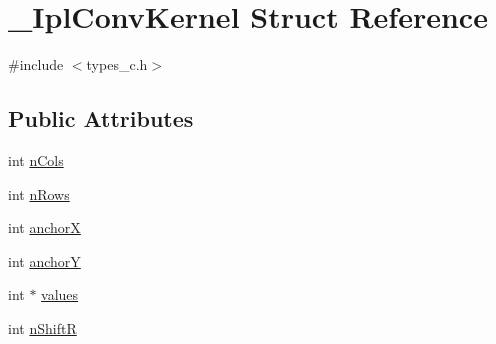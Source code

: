 \hypertarget{struct__IplConvKernel}{\section{\-\_\-\-Ipl\-Conv\-Kernel Struct Reference}
\label{struct__IplConvKernel}
}


{\ttfamily \#include $<$types\-\_\-c.\-h$>$}

\subsection*{Public Attributes}
\begin{DoxyCompactItemize}
\item 
int \hyperlink{struct__IplConvKernel_a222bb4c7231dcbec0ac75d9f6a38b4f4}{n\-Cols}
\item 
int \hyperlink{struct__IplConvKernel_a75a9788f86172938e3e1cfc4a3c614cc}{n\-Rows}
\item 
int \hyperlink{struct__IplConvKernel_ad19bd79b328a0fc5711966436e19bf55}{anchor\-X}
\item 
int \hyperlink{struct__IplConvKernel_ad3f5741f1681c095c9b4a2789f9c7881}{anchor\-Y}
\item 
int $\ast$ \hyperlink{struct__IplConvKernel_a164bc3bc4ec7c6a79419680567f2a0bc}{values}
\item 
int \hyperlink{struct__IplConvKernel_ab15600789f04faac97b457d9dc675b15}{n\-Shift\-R}
\end{DoxyCompactItemize}


